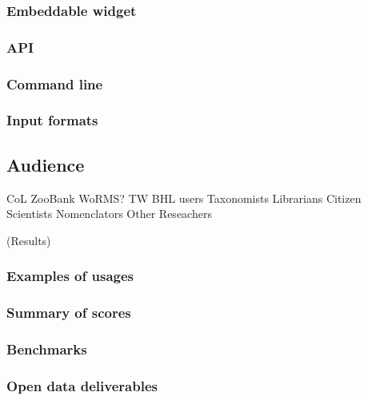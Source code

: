 \documentclass[
]{article}
\begin{document}
\hypertarget{embeddable-widget}{%
\subsubsection{Embeddable widget}\label{embeddable-widget}}

\hypertarget{api}{%
\subsubsection{API}\label{api}}

\hypertarget{command-line}{%
\subsubsection{Command line}\label{command-line}}

\hypertarget{input-formats}{%
\subsubsection{Input formats}\label{input-formats}}

\hypertarget{audience}{%
\subsection{Audience}\label{audience}}

CoL ZooBank WoRMS? TW BHL users Taxonomists Librarians Citizen
Scientists Nomenclators Other Reseachers

(Results)

\hypertarget{examples-of-usages}{%
\subsubsection{Examples of usages}\label{examples-of-usages}}

\hypertarget{summary-of-scores}{%
\subsubsection{Summary of scores}\label{summary-of-scores}}

\hypertarget{benchmarks}{%
\subsubsection{Benchmarks}\label{benchmarks}}

\hypertarget{open-data-deliverables}{%
\subsubsection{Open data deliverables}\label{open-data-deliverables}}
\end{document}
